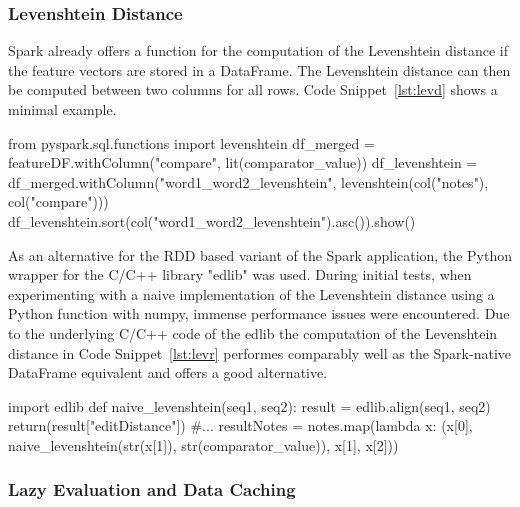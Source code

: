 \subsubsection{Levenshtein Distance}

Spark already offers a function for the computation of the Levenshtein distance if the feature vectors are stored in a DataFrame. The Levenshtein distance can then be computed between two columns for all rows. Code Snippet~\ref{lst:levd} shows a minimal example. 

\begin{pythonCode}[frame=single,label={lst:levd},caption={Levenshtein DataFrame},captionpos=b]
from pyspark.sql.functions import levenshtein 
df_merged = featureDF.withColumn("compare", lit(comparator_value)) 
df_levenshtein = df_merged.withColumn("word1_word2_levenshtein", levenshtein(col("notes"), col("compare")))
df_levenshtein.sort(col("word1_word2_levenshtein").asc()).show()
\end{pythonCode}

\noindent As an alternative for the RDD based variant of the Spark application, the Python wrapper for the C/C++ library "edlib" was used. During initial tests, when experimenting with a naive implementation of the Levenshtein distance using a Python function with numpy, immense performance issues were encountered. Due to the underlying C/C++ code of the edlib the computation of the Levenshtein distance in Code Snippet~\ref{lst:levr} performes comparably well as the Spark-native DataFrame equivalent and offers a good alternative. 

\begin{pythonCode}[frame=single,label={lst:levr},caption={Levenshtein RDD},captionpos=b]
import edlib
def naive_levenshtein(seq1, seq2):
    result = edlib.align(seq1, seq2)
    return(result["editDistance"])
#...
resultNotes = notes.map(lambda x: (x[0], naive_levenshtein(str(x[1]), str(comparator_value)), x[1], x[2]))
\end{pythonCode}

\subsubsection{Lazy Evaluation and Data Caching}\label{leval}

